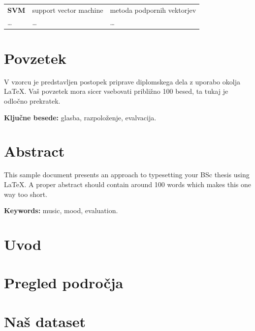 \documentclass[a4paper, 12pt]{book}
\newcommand{\tkeywords}{glasba, razpoloženje, evalvacija}
\newcommand{\tkeywordsEn}{music, mood, evaluation}
\newcommand{\clearemptydoublepage}{\newpage{\pagestyle{empty}\cleardoublepage}}
\begin{document}
{\begin{tabular}{l|l|l}
  
  {\bf SVM} & support vector machine & metoda podpornih vektorjev \\
  \dots & \dots & \dots \\
\end{tabular}



\clearemptydoublepage

\chapter*{Povzetek}
V vzorcu je predstavljen postopek priprave diplomskega dela z uporabo okolja \LaTeX. Vaš povzetek mora sicer vsebovati približno 100 besed, ta tukaj je odločno prekratek.
\bigskip

\noindent\textbf{Ključne besede:} \tkeywords.
\clearemptydoublepage

\chapter*{Abstract}
This sample document presents an approach to typesetting your BSc thesis using \LaTeX. A proper abstract should contain around 100 words which makes this one way too short.
\bigskip

\noindent\textbf{Keywords:} \tkeywordsEn.
\clearemptydoublepage

\mainmatter
\setcounter{page}{1}
\pagestyle{fancy}


\chapter{Uvod}


\chapter{Pregled področja}


\chapter{Naš dataset}

}
\end{document}
